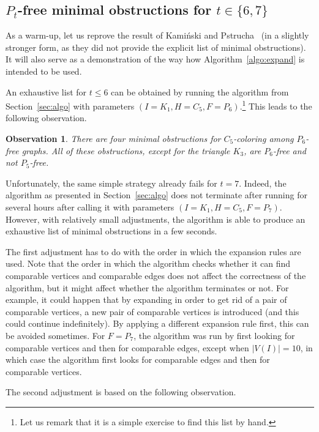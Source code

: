 \documentclass[11pt,a4paper]{article}
\theoremstyle{mystyle}
\newtheorem{observation}[theorem]{Observation}
\begin{document}
\subsection{$P_t$-free minimal obstructions for $t \in \{6,7\}$}
As a warm-up, let us reprove the result of Kami\'{n}ski and Pstrucha~\cite{DBLP:journals/dam/KaminskiP19} (in a slightly stronger form, as they did not provide the explicit list of minimal obstructions).
It will also serve as a demonstration of the way how Algorithm~\ref{algo:expand} is intended to be used. 

An exhaustive list for $t \leq 6$ can be obtained by running the algorithm from Section~\ref{sec:algo} with parameters $(I=K_1, H=C_5, F=P_6)$.\footnote{Let us remark that it is a simple exercise to find this list by hand.} This leads to the following observation.

\begin{observation}
There are four minimal obstructions for $C_5$-coloring among $P_6$-free graphs.
All of these obstructions, except for the triangle $K_3$, are $P_6$-free and not $P_5$-free.
\end{observation}

Unfortunately, the same simple strategy already fails for $t=7$.
Indeed, the algorithm as presented in Section~\ref{sec:algo} does not terminate after running for several hours after calling it with parameters $(I=K_1, H=C_5, F=P_7)$. However, with relatively small adjustments, the algorithm is able to produce an exhaustive list of minimal obstructions in a few seconds. 

The first adjustment has to do with the order in which the expansion rules are used. Note that the order in which the algorithm checks whether it can find comparable vertices and comparable edges does not affect the correctness of the algorithm, but it might affect whether the algorithm terminates or not. 
For example, it could happen that by expanding in order to get rid of a pair of comparable vertices, a new pair of comparable vertices is introduced (and this could continue indefinitely). By applying a different expansion rule first, this can be avoided sometimes. For $F=P_7$, the algorithm was run by first looking for comparable vertices and then for comparable edges, except when $|V(I)|=10$, in which case the algorithm first looks for comparable edges and then for comparable vertices.

The second adjustment is based on the following observation.
\end{document}
